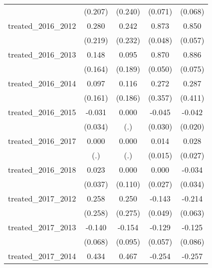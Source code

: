 {\begin{tabular}{l*{4}{c}}
            &     (0.207)         &     (0.240)         &     (0.071)         &     (0.068)         \\
[1em]
treated\_2016\_2012&       0.280         &       0.242         &       0.873\sym{***}&       0.850\sym{***}\\
            &     (0.219)         &     (0.232)         &     (0.048)         &     (0.057)         \\
[1em]
treated\_2016\_2013&       0.148         &       0.095         &       0.870\sym{***}&       0.886\sym{***}\\
            &     (0.164)         &     (0.189)         &     (0.050)         &     (0.075)         \\
[1em]
treated\_2016\_2014&       0.097         &       0.116         &       0.272         &       0.287         \\
            &     (0.161)         &     (0.186)         &     (0.357)         &     (0.411)         \\
[1em]
treated\_2016\_2015&      -0.031         &       0.000         &      -0.045         &      -0.042\sym{*}  \\
            &     (0.034)         &         (.)         &     (0.030)         &     (0.020)         \\
[1em]
treated\_2016\_2017&       0.000         &       0.000         &       0.014         &       0.028         \\
            &         (.)         &         (.)         &     (0.015)         &     (0.027)         \\
[1em]
treated\_2016\_2018&       0.023         &       0.000         &       0.000         &      -0.034         \\
            &     (0.037)         &     (0.110)         &     (0.027)         &     (0.034)         \\
[1em]
treated\_2017\_2012&       0.258         &       0.250         &      -0.143\sym{**} &      -0.214\sym{***}\\
            &     (0.258)         &     (0.275)         &     (0.049)         &     (0.063)         \\
[1em]
treated\_2017\_2013&      -0.140\sym{*}  &      -0.154         &      -0.129\sym{*}  &      -0.125         \\
            &     (0.068)         &     (0.095)         &     (0.057)         &     (0.086)         \\
[1em]
treated\_2017\_2014&       0.434         &       0.467         &      -0.254\sym{***}&      -0.257\sym{***}\\

\end{tabular}}
